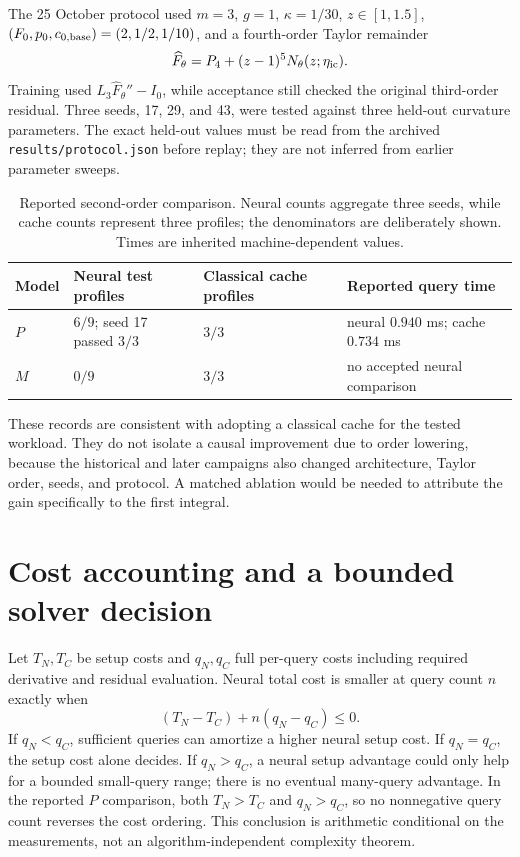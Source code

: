 \documentclass[11pt,a4paper,oneside]{report}
\numberwithin{equation}{chapter}
\DeclareRobustCommand{\code}[1]{\nolinkurl{#1}}
\begin{document}
The 25 October protocol used $m=3$, $g=1$, $\kappa=1/30$, $z\in[1,1.5]$, $(F_0,p_0,c_{0,\rm base})=(2,1/2,1/10)$, and a fourth-order Taylor remainder
\begin{equation}
\widehat F_\theta=P_4+(z-1)^5N_\theta(z;\eta_{\rm ic}).
\end{equation}
Training used $L_3\widehat F_\theta''-I_0$, while acceptance still checked the original third-order residual. Three seeds, 17, 29, and 43, were tested against three held-out curvature parameters. The exact held-out values must be read from the archived \code{results/protocol.json} before replay; they are not inferred from earlier parameter sweeps.

\begin{table}[!htbp]\centering\small
\begin{tabularx}{\textwidth}{@{}lXXX@{}}\toprule
Model & Neural test profiles & Classical cache profiles & Reported query time\\\midrule
$P$ & $6/9$; seed 17 passed $3/3$ & $3/3$ & neural $0.940$ ms; cache $0.734$ ms\\
$M$ & $0/9$ & $3/3$ & no accepted neural comparison\\\bottomrule
\end{tabularx}
\caption{Reported second-order comparison. Neural counts aggregate three seeds, while cache counts represent three profiles; the denominators are deliberately shown. Times are inherited machine-dependent values.}\label{tab:cache}
\end{table}
These records are consistent with adopting a classical cache for the tested workload. They do not isolate a causal improvement due to order lowering, because the historical and later campaigns also changed architecture, Taylor order, seeds, and protocol. A matched ablation would be needed to attribute the gain specifically to the first integral.

\section{Cost accounting and a bounded solver decision}
Let $T_N,T_C$ be setup costs and $q_N,q_C$ full per-query costs including required derivative and residual evaluation. Neural total cost is smaller at query count $n$ exactly when
\begin{equation}\label{eq:cost}
(T_N-T_C)+n(q_N-q_C)\le0.
\end{equation}
If $q_N<q_C$, sufficient queries can amortize a higher neural setup cost. If $q_N=q_C$, the setup cost alone decides. If $q_N>q_C$, a neural setup advantage could only help for a bounded small-query range; there is no eventual many-query advantage. In the reported $P$ comparison, both $T_N>T_C$ and $q_N>q_C$, so no nonnegative query count reverses the cost ordering. This conclusion is arithmetic conditional on the measurements, not an algorithm-independent complexity theorem.
\end{document}
